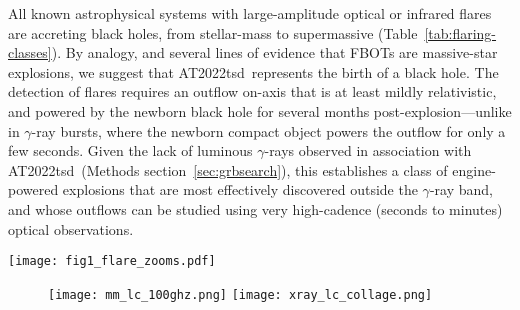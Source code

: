 \documentclass{nature_plusfigure}
\newcommand{\at}{AT2022tsd}
\begin{document}
All known astrophysical systems with large-amplitude optical or infrared flares are accreting black holes, from stellar-mass to supermassive (Table~\ref{tab:flaring-classes}). By analogy, and several lines of evidence that FBOTs are massive-star explosions, we suggest that \at\ represents the birth of a black hole.
The detection of flares requires an outflow on-axis that is at least mildly relativistic, and powered by the newborn black hole for several months post-explosion---unlike in $\gamma$-ray bursts, where the newborn compact object powers the outflow for only a few seconds. Given the lack of luminous $\gamma$-rays observed in association with \at\ (Methods section~\ref{sec:grbsearch}), this establishes a class of engine-powered explosions that are most effectively discovered outside the $\gamma$-ray band, and whose outflows can be studied using very high-cadence (seconds to minutes) optical observations.

\newpage

\begin{figure*}
\centering
    \texttt{[image: fig1\_flare\_zooms.pdf]}
\caption{\textbf{\at\ optical light curve.}
  The original transient event (top panel, $\Delta t_\mathrm{obs}<28\,$d) was followed by prominent short-duration (minutes to hours) flares with amplitudes of a few to $100\times$. Measurements have been corrected for Milky Way extinction, and error bars are 1-$\sigma$. Upper limits (3-$\sigma$) are shown as open triangles. Epochs of follow-up observations (optical spectroscopy, X-ray, and radio) are marked in the top panel. Absolute magnitude is AB magnitudes of the rest-frame filterband blueshifted by $(1+z)$. For ULTRASPEC observations, points with S/N$>5$ are filled in, and the $g$-band inset shows the light curve smoothed using a 3-minute running average.}
 \label{fig:optical-lc}
\end{figure*}

\begin{figure*}
\centering
    \begin{subfigure}[t]{1.0\textwidth}
         \centering
         \texttt{[image: mm\_lc\_100ghz.png]}
        \texttt{[image: xray\_lc\_collage.png]}
     \end{subfigure}
\caption{\textbf{Millimeter (left) and X-ray (right) light curves of \at} and other radio-loud luminous fast blue optical transients (LFBOTs) compared to different classes of extragalactic transients: tidal disruption events (TDEs), long-duration gamma-ray bursts (LGRBs), low-luminosity GRBs (LLGRBs), and core-collapse supernovae (CC SNe). The millimeter and X-ray luminosity of LFBOTs resembles relativistic explosions such as LGRBs, and \at\ has the most luminous X-ray emission of any LFBOT to date. The millimeter points for AT2022tsd, and the X-ray points for AT2022tsd and FBOT AT2020xnd, are outlined in black for clarity.}
 \label{fig:mm-xray-lc}
\end{figure*}
\end{document}
